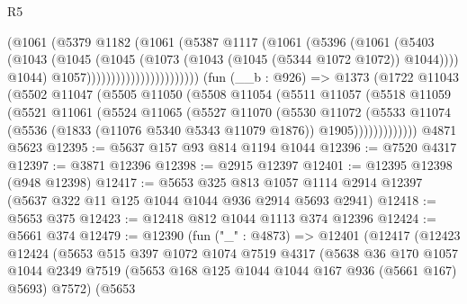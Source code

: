 \begin{lexlean}{R5}
\begin{coremodule}
                                  (@1061
                                    (@5379
                                      @1182
                                      (@1061
                                        (@5387
                                          @1117
                                          (@1061
                                            (@5396
                                              (@1061
                                                (@5403
                                                  (@1043
                                                    (@1045
                                                      (@1045
                                                        (@1073
                                                          (@1043
                                                            (@1045 (@5344 @1072 @1072))
                                                            @1044))))
                                                    @1044)
                                                  @1057)))))))))))))))))))))))
    (fun (__b : @926) =>
    @1373
      (@1722
        @11043
        (@5502
          @11047
          (@5505
            @11050
            (@5508
              @11054
              (@5511
                @11057
                (@5518
                  @11059
                  (@5521
                    @11061
                    (@5524
                      @11065
                      (@5527
                        @11070
                        (@5530
                          @11072
                          (@5533
                            @11074
                            (@5536 (@1833 (@11076 @5340 @5343 @11079 @1876)) @1905)))))))))))))
    @4871
    @5623
@12395 := @5637 @157 @93 @814 @1194 @1044
@12396 := @7520 @4317
@12397 := @3871 @12396
@12398 := @2915 @12397
@12401 := @12395 @12398 (@948 @12398)
@12417 := @5653
    @325
    @813
    @1057
    @1114
    @2914
    @12397
    (@5637 @322 @11 @125 @1044 @1044 @936 @2914 @5693 @2941)
@12418 := @5653 @375
@12423 := @12418 @812 @1044 @1113 @374 @12396
@12424 := @5661 @374
@12479 := @12390
    (fun ("_" : @4873) =>
    @12401
      (@12417
        (@12423
          @12424
          (@5653
            @515
            @397
            @1072
            @1074
            @7519
            @4317
            (@5638
              @36
              @170
              @1057
              @1044
              @2349
              @7519
              (@5653 @168 @125 @1044 @1044 @167 @936 (@5661 @167) @5693)
              @7572)
            (@5653

\end{coremodule}
\end{lexlean}
